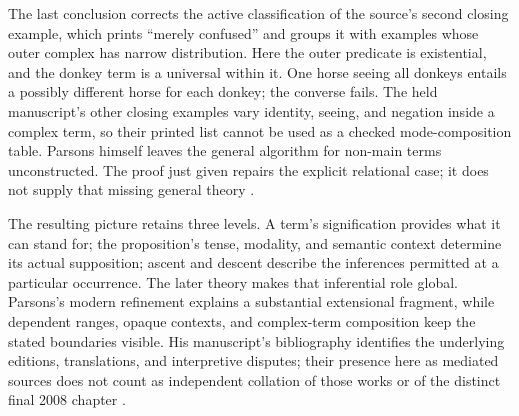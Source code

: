 The last conclusion corrects the active classification of the source's
second closing example, which prints ``merely confused'' and groups
it with examples whose outer complex has narrow distribution. Here
the outer predicate is existential, and the donkey term is a universal
within it. One horse seeing all donkeys entails a possibly different
horse for each donkey; the converse fails. The held manuscript's other
closing examples vary identity, seeing, and negation inside a complex
term, so their printed list cannot be used as a checked mode-composition
table. Parsons himself leaves the general algorithm for non-main terms
unconstructed. The proof just given repairs the explicit relational
case; it does not supply that missing general theory
\cite[p.~276]{Parsons2007FordhamSupposition}.

The resulting picture retains three levels. A term's signification
provides what it can stand for; the proposition's tense, modality,
and semantic context determine its actual supposition; ascent and
descent describe the inferences permitted at a particular occurrence.
The later theory makes that inferential role global. Parsons's modern
refinement explains a substantial extensional fragment, while dependent
ranges, opaque contexts, and complex-term composition keep the stated
boundaries visible. His manuscript's bibliography identifies the
underlying editions, translations, and interpretive disputes; their
presence here as mediated sources does not count as independent
collation of those works or of the distinct final 2008 chapter
\cite[pp.~276--280]{Parsons2007FordhamSupposition}.
